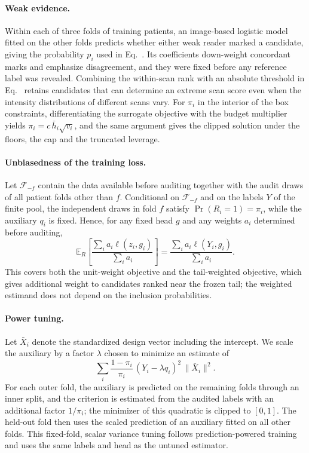 \paragraph{Weak evidence.}
Within each of three folds of training patients, an image-based logistic model fitted on the other folds predicts whether either weak reader marked a candidate, giving the probability $p_i$ used in Eq.~. Its coefficients down-weight concordant marks and emphasize disagreement, and they were fixed before any reference label was revealed. Combining the within-scan rank with an absolute threshold in Eq.~ retains candidates that can determine an extreme scan score even when the intensity distributions of different scans vary. For $\pi_i$ in the interior of the box constraints, differentiating the surrogate objective with the budget multiplier yields $\pi_i=c\,\bar h_i\sqrt{v_i}$, and the same argument gives the clipped solution under the floors, the cap and the truncated leverage.

\paragraph{Unbiasedness of the training loss.}
Let $\mathcal F_{-f}$ contain the data available before auditing together with the audit draws of all patient folds other than $f$. Conditional on $\mathcal F_{-f}$ and on the labels $Y$ of the finite pool, the independent draws in fold $f$ satisfy $\Pr(R_i=1)=\pi_i$, while the auxiliary $q_i$ is fixed. Hence, for any fixed head $g$ and any weights $a_i$ determined before auditing,
\[
 \mathbb E_R\!\left[\frac{\sum_i a_i\ell(z_i,g_i)}{\sum_i a_i}\right]
 =\frac{\sum_i a_i\ell(Y_i,g_i)}{\sum_i a_i}.
\]
This covers both the unit-weight objective and the tail-weighted objective, which gives additional weight to candidates ranked near the frozen tail; the weighted estimand does not depend on the inclusion probabilities.

\paragraph{Power tuning.}
Let $\bar X_i$ denote the standardized design vector including the intercept. We scale the auxiliary by a factor $\lambda$ chosen to minimize an estimate of
\[
 \sum_i\frac{1-\pi_i}{\pi_i}\,(Y_i-\lambda q_i)^2\,\|\bar X_i\|^2 .
\]
For each outer fold, the auxiliary is predicted on the remaining folds through an inner split, and the criterion is estimated from the audited labels with an additional factor $1/\pi_i$; the minimizer of this quadratic is clipped to $[0,1]$. The held-out fold then uses the scaled prediction of an auxiliary fitted on all other folds. This fixed-fold, scalar variance tuning follows prediction-powered training~\cite{ppssl2025} and uses the same labels and head as the untuned estimator.

